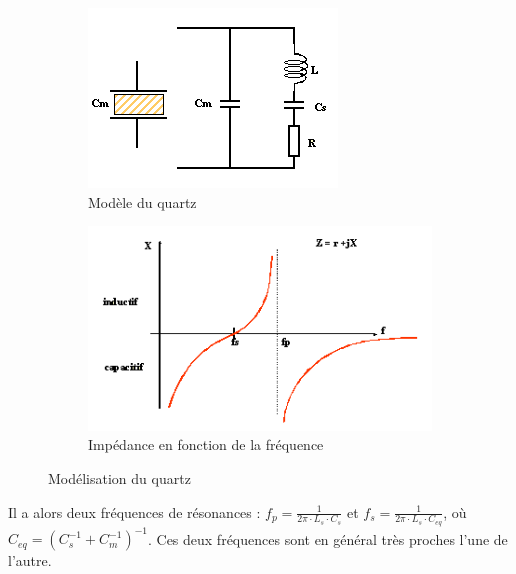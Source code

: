 \documentclass{article}
\begin{document}
\begin{figure}[h]
	\centering
	\begin{subfigure}[b]{0.4\textwidth}
		\centering
		\includegraphics[width=\textwidth]{modele_quartz}
		\caption{Modèle du quartz}
		\label{fig:modele_quartz}
	\end{subfigure}
	\hfill
	\begin{subfigure}[b]{0.4\textwidth}
		\centering
		\includegraphics[width=\textwidth]{impedence_quartz}
		\caption{Impédance en fonction de la fréquence}
		\label{fig:impedance_quartz}
	\end{subfigure}
	\caption{Modélisation du quartz}
\end{figure}

Il a alors deux fréquences de résonances : $f_p=\frac{1}{2\pi \cdot L_s \cdot C_s}$ et $f_s=\frac{1}{2\pi \cdot L_s \cdot C_{eq}}$, où $C_{eq} = (C_s^{-1} + C_m^{-1})^{-1}$. Ces deux fréquences sont en général très proches l'une de l'autre.
\end{document}
